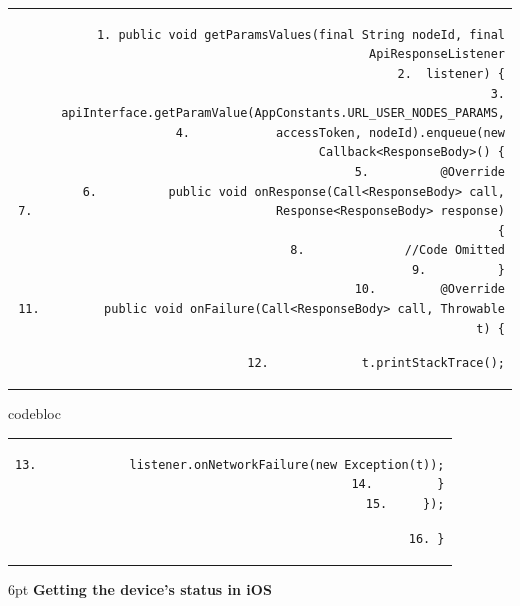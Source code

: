 \documentclass[a4paper,12pt,openany]{book}
\renewcommand{\ttfamily}{\fontfamily{pcr}\selectfont}
\renewcommand{\arraystretch}{1}
\newenvironment{codebloc}{ %
    \ttfamily\footnotesize
    \renewcommand{\arraystretch}{1}
}
\newcommand{\note}[2][NOTE]{ %
\vspace{6pt}
\begin{tabular}{b{\textwidth}}
\hline
\fontfamily{phv}\selectfont \textbf{#1}\\
\leftskip 1em #2\\
\hline
\end{tabular}
}
\begin{document}
\begin{codebloc}
\begin{tabular}{d}
\vspace{2pt}
\begin{verbatim}
1. public void getParamsValues(final String nodeId, final ApiResponseListener
2.  listener) {
3.      apiInterface.getParamValue(AppConstants.URL_USER_NODES_PARAMS,
4.            accessToken, nodeId).enqueue(new Callback<ResponseBody>() {
5.          @Override
6.          public void onResponse(Call<ResponseBody> call,
7.                                  Response<ResponseBody> response) {
8.              //Code Omitted
9.          }
10.         @Override
11.         public void onFailure(Call<ResponseBody> call, Throwable t) {
\end{verbatim}
\verb|12.             t.printStackTrace();|
\end{tabular}
\end{codebloc}

\begin{codebloc}
\begin{tabular}{d}
\vspace{2pt}
\begin{verbatim}
13.             listener.onNetworkFailure(new Exception(t));
14.         }
15.     });
\end{verbatim}
\verb|16. }|
\end{tabular}
\end{codebloc}

\vspace{6pt}
\textbf{Getting the device’s status in iOS}

\end{document}
